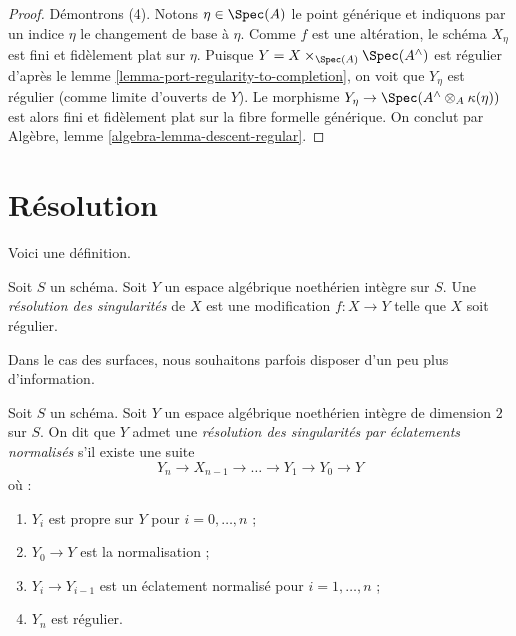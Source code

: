 \begin{proof}
\medskip\noindent
Démontrons (4). Notons $\eta \in \Spec(A)$ le point générique et indiquons
par un indice $\eta$ le changement de base à $\eta$.
Comme $f$ est une altération, le schéma $X_\eta$ est fini et fidèlement plat
sur $\eta$. Puisque $Y = X \times_{\Spec(A)} \Spec(A^\wedge)$ est régulier
d'après le lemme \ref{lemma-port-regularity-to-completion}, on voit que
$Y_\eta$ est régulier (comme limite d'ouverts de $Y$).
Le morphisme $Y_\eta \to \Spec(A^\wedge \otimes_A \kappa(\eta))$ est alors
fini et fidèlement plat sur la fibre formelle générique. On conclut par
Algèbre, lemme \ref{algebra-lemma-descent-regular}.
\end{proof}











\section{Résolution}
\label{section-resolution}

\noindent
Voici une définition.

\begin{definition}
\label{definition-resolution}
Soit $S$ un schéma. Soit $Y$ un espace algébrique noethérien intègre sur $S$.
Une {\it résolution des singularités} de $X$ est une modification
$f : X \to Y$ telle que $X$ soit régulier.
\end{definition}

\noindent
Dans le cas des surfaces, nous souhaitons parfois disposer d'un peu plus
d'information.

\begin{definition}
\label{definition-resolution-surface}
Soit $S$ un schéma. Soit $Y$ un espace algébrique noethérien intègre de
dimension $2$ sur $S$. On dit que $Y$ admet une
{\it résolution des singularités par éclatements normalisés}
s'il existe une suite
$$
Y_n \to X_{n - 1} \to \ldots \to Y_1 \to Y_0 \to Y
$$
où :
\begin{enumerate}
\item $Y_i$ est propre sur $Y$ pour $i = 0, \ldots, n$ ;
\item $Y_0 \to Y$ est la normalisation ;
\item $Y_i \to Y_{i - 1}$ est un éclatement normalisé pour
$i = 1, \ldots, n$ ;
\item $Y_n$ est régulier.
\end{enumerate}
\end{definition}

